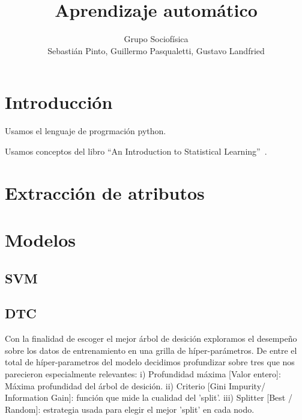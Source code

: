 \documentclass[a4paper,10pt]{article}
\title{Aprendizaje autom\'atico}
\author{Grupo Sociof\'isica \\
Sebasti\'an Pinto, Guillermo Pasqualetti, Gustavo Landfried}
\begin{document}
\maketitle

\section{Introducci\'on}

Usamos el lenguaje de progrmaci\'on python. 

Usamos conceptos del libro ``An Introduction to Statistical Learning''~\cite{james_hastie_tibshirani}.

\section{Extracci\'on de atributos}

\section{Modelos}

\subsection{SVM}


\subsection{DTC}

\par Con la finalidad de escoger el mejor árbol de desición exploramos 
el desempeño sobre los datos de entrenamiento en una grilla de híper-parámetros.
De entre el total de híper-parametros del modelo decidimos profundizar sobre 
tres que nos parecieron especialmente relevantes:
i) Profundidad máxima [Valor entero]: Máxima profundidad del árbol de desición.
ii) Criterio [Gini Impurity/ Information Gain]: función que mide la cualidad 
del 'split'.
iii) Splitter [Best / Random]: estrategia usada para elegir el mejor 
'split' en cada nodo.
\end{document}
